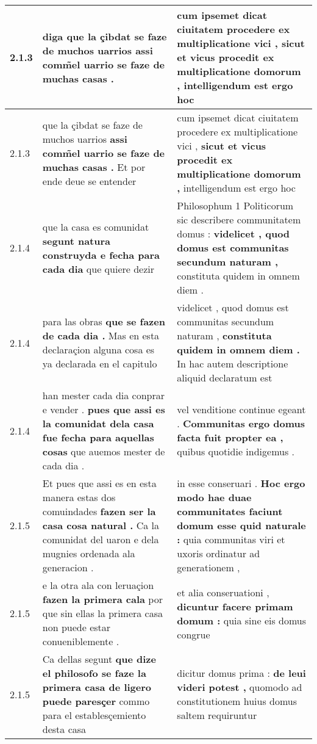 \begin{tabular}{|p{1cm}|p{6.5cm}|p{6.5cm}|}
2.1.3 & diga \textbf{ que la çibdat se faze de muchos uarrios } assi comm̃el uarrio se faze de muchas casas . & cum ipsemet dicat ciuitatem procedere ex multiplicatione vici , \textbf{ sicut et vicus procedit ex multiplicatione domorum , } intelligendum est ergo hoc \\\hline
2.1.3 & que la çibdat se faze de muchos uarrios \textbf{ assi comm̃el uarrio se faze de muchas casas . } Et por ende deue se entender & cum ipsemet dicat ciuitatem procedere ex multiplicatione vici , \textbf{ sicut et vicus procedit ex multiplicatione domorum , } intelligendum est ergo hoc \\\hline
2.1.4 & que la casa es comunidat \textbf{ segunt natura construyda e fecha para cada dia } que quiere dezir & Philosophum 1 Politicorum sic describere communitatem domus : \textbf{ videlicet , quod domus est communitas secundum naturam , } constituta quidem in omnem diem . \\\hline
2.1.4 & para las obras \textbf{ que se fazen de cada dia . } Mas en esta declaraçion alguna cosa es ya declarada en el capitulo & videlicet , quod domus est communitas secundum naturam , \textbf{ constituta quidem in omnem diem . } In hac autem descriptione aliquid declaratum est \\\hline
2.1.4 & han mester cada dia conprar e vender . \textbf{ pues que assi es la comunidat dela casa fue fecha para aquellas cosas } que auemos mester de cada dia . & vel venditione continue egeant . \textbf{ Communitas ergo domus facta fuit propter ea , } quibus quotidie indigemus . \\\hline
2.1.5 & Et pues que assi es en esta manera estas dos comuindades \textbf{ fazen ser la casa cosa natural . } Ca la comunidat del uaron e dela mugnies ordenada ala generacion . & in esse conseruari . \textbf{ Hoc ergo modo hae duae communitates faciunt domum esse quid naturale : } quia communitas viri et uxoris ordinatur ad generationem , \\\hline
2.1.5 & e la otra ala con leruaçion \textbf{ fazen la primera cala } por que sin ellas la primera casa non puede estar conueniblemente . & et alia conseruationi , \textbf{ dicuntur facere primam domum : } quia sine eis domus congrue \\\hline
2.1.5 & Ca dellas segunt \textbf{ que dize el philosofo se faze la primera casa de ligero puede paresçer } commo para el establesçemiento desta casa & dicitur domus prima : \textbf{ de leui videri potest , } quomodo ad constitutionem huius domus saltem requiruntur \\\hline

\end{tabular}
